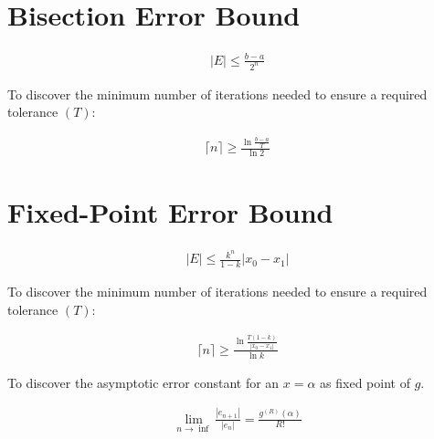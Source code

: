 \section{Bisection Error Bound}

	\begin{align}
		|E| \leq \frac{b-a}{2^{n}}
		\label{eq:bisectionerror}
	\end{align}

	To discover the minimum number of iterations needed to ensure a required tolerance $(T)$:

	\begin{align}
		\lceil n \rceil \geq \frac{\ln{\frac{b-a}{T}}}{\ln{2}}
		\label{eq:bisectiontolerance}
	\end{align}

\section{Fixed-Point Error Bound}

	\begin{align}
		|E| \leq \frac{k^{n}}{1-k}|x_{0} - x_{1}|
		\label{eq:fperror}
	\end{align}

	To discover the minimum number of iterations needed to ensure a required tolerance $(T)$:

	\begin{align}
		\lceil n \rceil \geq \frac{\ln{\frac{T(1-k)}{|x_{0} - x_{1}|}}}{\ln{k}}
		\label{eq:fptolerance}
	\end{align}

	To discover the asymptotic error constant for an $x = \alpha$ as fixed point of $g$.

	\begin{align}
		\lim_{n\to\inf} \frac{|e_{n+1}|}{|e_{n}|} = \frac{g^{(R)}(\alpha)}{R!}
		\label{eq:fptolerance}
	\end{align}